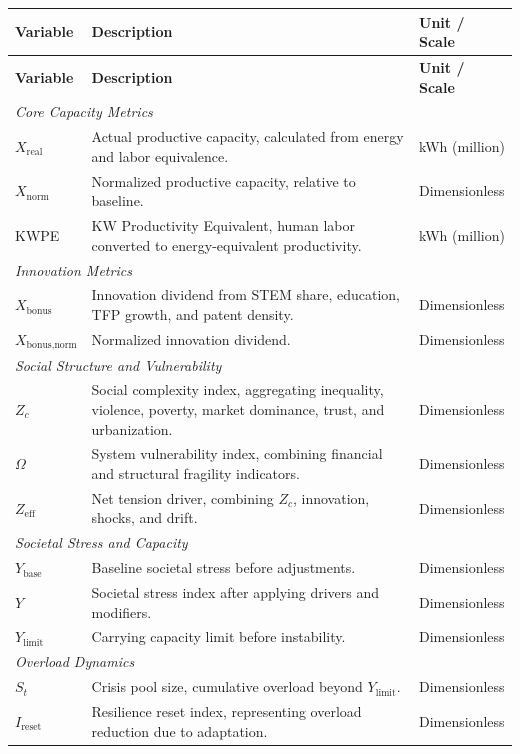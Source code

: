 \documentclass[12pt,a4paper]{article}
\begin{document}
\begin{longtable}{p{3cm} p{9cm} p{3cm}}
\toprule
\textbf{Variable} & \textbf{Description} & \textbf{Unit / Scale} \\
\midrule
\endfirsthead
\toprule
\textbf{Variable} & \textbf{Description} & \textbf{Unit / Scale} \\
\midrule
\endhead

\multicolumn{3}{l}{\textit{Core Capacity Metrics}} \\
$X_{\text{real}}$ & Actual productive capacity, calculated from energy and labor equivalence. & kWh (million) \\
$X_{\text{norm}}$ & Normalized productive capacity, relative to baseline. & Dimensionless \\
KWPE & KW Productivity Equivalent, human labor converted to energy-equivalent productivity. & kWh (million) \\

\multicolumn{3}{l}{\textit{Innovation Metrics}} \\
$X_{\text{bonus}}$ & Innovation dividend from STEM share, education, TFP growth, and patent density. & Dimensionless \\
$X_{\text{bonus,norm}}$ & Normalized innovation dividend. & Dimensionless \\

\multicolumn{3}{l}{\textit{Social Structure and Vulnerability}} \\
$Z_c$ & Social complexity index, aggregating inequality, violence, poverty, market dominance, trust, and urbanization. & Dimensionless \\
$\Omega$ & System vulnerability index, combining financial and structural fragility indicators. & Dimensionless \\
$Z_{\mathrm{eff}}$ & Net tension driver, combining $Z_c$, innovation, shocks, and drift. & Dimensionless \\

\multicolumn{3}{l}{\textit{Societal Stress and Capacity}} \\
$Y_{\text{base}}$ & Baseline societal stress before adjustments. & Dimensionless \\
$Y$ & Societal stress index after applying drivers and modifiers. & Dimensionless \\
$Y_{\mathrm{limit}}$ & Carrying capacity limit before instability. & Dimensionless \\

\multicolumn{3}{l}{\textit{Overload Dynamics}} \\
$S_t$ & Crisis pool size, cumulative overload beyond $Y_{\mathrm{limit}}$. & Dimensionless \\
$I_{\mathrm{reset}}$ & Resilience reset index, representing overload reduction due to adaptation. & Dimensionless \\


\end{longtable}
\end{document}
